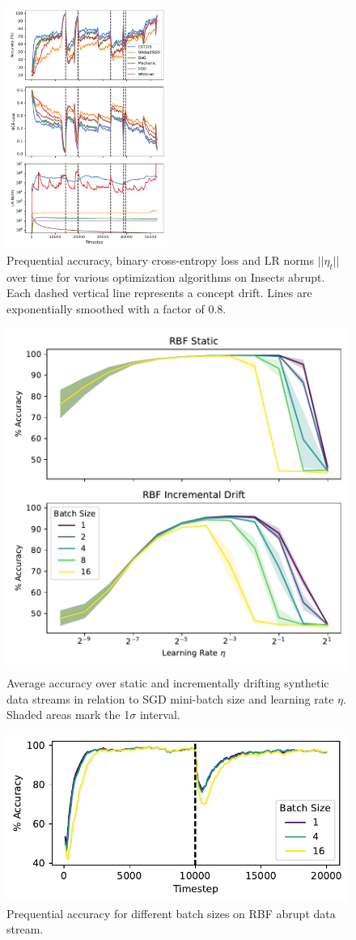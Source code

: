 \documentclass[letterpaper]{article} %
\begin{document}
\begin{figure}
	\centering
	\includegraphics[width=0.47\textwidth]{figures/lr_norms_optims_insects_abrupt.pdf}
	\caption{Prequential accuracy, binary cross-entropy loss and LR norms $||\eta_t||$ over time for various optimization algorithms on Insects abrupt. Each dashed vertical line represents a concept drift. Lines are exponentially smoothed with a factor of 0.8.}
\end{figure}
\begin{figure}
	\centering
	\includegraphics[width=.47\textwidth]{figures/batch_size_lr_wstd.pdf}
	\caption{Average accuracy over static and incrementally drifting synthetic data streams in relation to SGD mini-batch size and learning rate $\eta$. Shaded areas mark the 1$\sigma$ interval.}\label{fig:batch_size_lr}
\end{figure}

\begin{figure}
	\centering
	\includegraphics[width=.47\textwidth]{figures/accuracy_vs_time.pdf}
	\caption{Prequential accuracy for different batch sizes on RBF abrupt data stream.}
\end{figure}
\end{document}
